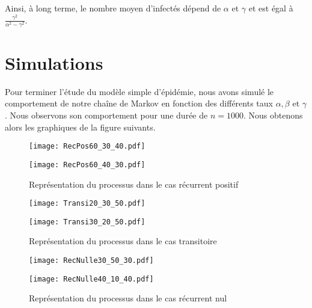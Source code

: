 \documentclass[12pt,a4paper]{report}
\theoremstyle{remark}
\begin{document}
Ainsi, à long terme, le nombre moyen d'infectés dépend de $\alpha$ et $\gamma$ et est égal à $\frac{\gamma^2}{\alpha^2-\gamma^2}$.

\section{Simulations}
\vspace{0.6cm}

Pour terminer l'étude du modèle simple d'épidémie, nous avons simulé le comportement de notre chaîne de Markov en fonction des différents taux $\alpha, \beta$ et $ \gamma$. Nous observons son comportement pour une durée de $n=1000$. Nous obtenons alors les graphiques de la figure suivants. \\
\begin{figure}[h!]
    \begin{minipage}[c]{0.25\linewidth}
        \centering
        \texttt{[image: RecPos60\_30\_40.pdf]}
    \end{minipage}
    \hfill%
    \vspace{0.1cm}
    \begin{minipage}[c]{0.50\linewidth}
        \centering
        \texttt{[image: RecPos60\_40\_30.pdf]}  
    \end{minipage}
    \caption{Représentation du processus dans le cas récurrent positif}
    \label{fig_rec_positif}
\end{figure}

\begin{figure}[h!]
    \begin{minipage}[c]{0.25\linewidth}
        \centering
        \texttt{[image: Transi20\_30\_50.pdf]}
    \end{minipage}
    \hfill%
    \vspace{0.1cm}
    \begin{minipage}[c]{0.50\linewidth}
        \centering
        \texttt{[image: Transi30\_20\_50.pdf]}
    \end{minipage}
      \caption{Représentation du processus dans le cas transitoire}
      \label{fig_transitoire}
\end{figure}

\begin{figure}[h!]
    \begin{minipage}[c]{0.25\linewidth}
        \centering
        \texttt{[image: RecNulle30\_50\_30.pdf]}
    \end{minipage}
    \hfill%
    \vspace{0.1cm}
    \begin{minipage}[c]{0.50\linewidth}
        \centering
        \texttt{[image: RecNulle40\_10\_40.pdf]}
    \end{minipage}
      \caption{Représentation du processus dans le cas récurrent nul}
      \label{fig_rec_nul}
\end{figure}
 
\end{document}
